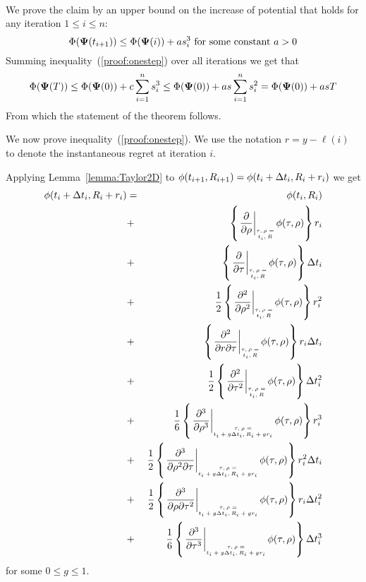 \documentclass{article}[12pt]
\begin{document}
{{\\
We prove the claim by an upper bound on the increase of potential that holds for any iteration $1 \leq i \leq n$:
\begin{equation} \label{proof:onestep}
\Phi({\bf \Psi}(t_{i+1})) \leq \Phi({\bf \Psi}(i)) + a s_i^3 \mbox{ for some constant } a>0
\end{equation}
Summing inequality~(\ref{proof:onestep}) over all iterations we get that 
\begin{equation} \label{proof:allsteps}
\Phi({\bf \Psi}(T)) \leq \Phi({\bf \Psi}(0)) + c \sum_{i=1}^n s_i^3 \leq 
\Phi({\bf \Psi}(0)) + a s \sum_{i=1}^n s_i^2 = 
\Phi({\bf \Psi}(0)) + a s T
\end{equation}
From which the statement of the theorem follows.

We now prove inequality~(\ref{proof:onestep}). 
We use the notation $r=y -\ell(i)$ to denote the instantaneous regret at iteration $i$. 


Applying Lemma~\ref{lemma:Taylor2D} to
$\phi(t_{i+1},R_{i+1})=\phi(t_i+\Delta t_i,R_i+r_i)$  we get
\begin{eqnarray} 
    \pot(t_i+\deltat_i,\R_i+r_i) & =&  
    \pot(t_i,\R_i)\\
    &+&\at{\frac{\partial}{\partial \rho}} r_i \\
    &+&\at{\frac{\partial}{\partial \tau}}  \deltat_i \\
    &+& \frac{1}{2} \at{\frac{\partial^2}{\partial \rho^2}} r_i^2 \\
    &+& \at{\frac{\partial^2}{\partial r \partial \tau}} r_i \deltat_i \label{term:Taylor_rdt}\\
    &+& \frac{1}{2} \at{\frac{\partial^2}{\partial \tau^2}} \deltat_i^2 \label{term:Taylor_dtsquare}\\
    &+& \frac{1}{6} \att{\frac{\partial^3}{\partial \rho^3}} r_i^3 \label{term:Taylor_r3}\\
    &+& \frac{1}{2} \att{\frac{\partial^3}{\partial \rho^2 \partial \tau}} r_i^2\deltat_i \label{term:Taylor_r2t}\\
    &+& \frac{1}{2} \att{\frac{\partial^3}{\partial \rho \partial \tau^2}} r_i\deltat_i^2 \label{term:Taylor_rt2}\\
    &+& \frac{1}{6} \att{\frac{\partial^3}{\partial \tau^3}} \deltat_i^3 \label{term:Taylor_t3}
\end{eqnarray}
for some $0 \leq g \leq 1$.

}}
\end{document}
